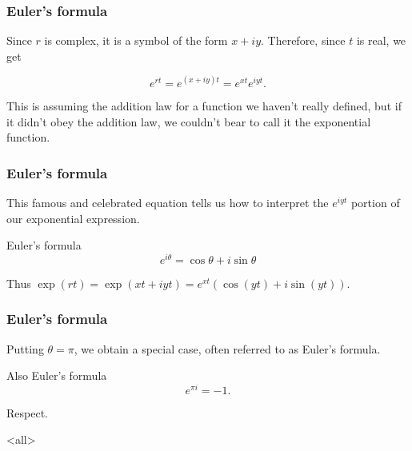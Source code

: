 \begin{frame}

\frametitle{Euler's formula}
\label{eulersformula}

Since $r$ is complex, it is a symbol of the form $x + iy$. Therefore, since $t$ is real, we get

\[
    e^{rt} = e^{(x+iy)t} = e^{xt} e^{iyt}.
  \]

This is assuming the addition law for a function we haven't really defined, but if it didn't obey the addition law, we couldn't bear to call it the exponential function.

\end{frame}

\begin{frame}

\frametitle{Euler's formula}
\label{eulersformula}

This famous and celebrated equation tells us how to interpret the $e^{iyt}$ portion of our exponential expression.

 \begin{block}{Euler's formula} 
 \[e^{i \theta} = \cos{\theta} + i \sin{\theta}\]
  \end{block}  

Thus $\exp(rt) = \exp(xt + iyt) = e^{xt}(\cos{(yt)} + i \sin{(yt)})$.

\end{frame}

\begin{frame}

\frametitle{Euler's formula}
\label{eulersformula}

Putting $\theta = \pi$, we obtain a special case, often referred to as Euler's formula.

 \begin{block}{Also Euler's formula} 
 \[ e^{\pi i} = -1. \]
  \end{block} 

Respect.

\end{frame}

\mode<all>


\mode*

